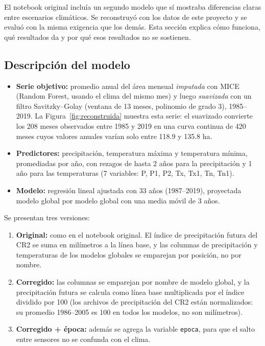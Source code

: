 \documentclass[11pt,a4paper]{article}
\begin{document}
El notebook original incluía un segundo modelo que sí mostraba diferencias claras entre escenarios climáticos. Se reconstruyó con los datos de este proyecto y se evaluó con la misma exigencia que los demás. Esta sección explica cómo funciona, qué resultados da y por qué esos resultados no se sostienen.

\subsection{Descripción del modelo}

\begin{itemize}
\item \textbf{Serie objetivo:} promedio anual del área mensual \emph{imputada} con MICE (Random Forest, usando el clima del mismo mes) y luego \emph{suavizada} con un filtro Savitzky--Golay (ventana de 13 meses, polinomio de grado 3), 1985--2019. La Figura~\ref{fig:reconstruida} muestra esta serie: el suavizado convierte los 208 meses observados entre 1985 y 2019 en una curva continua de 420 meses cuyos valores anuales varían solo entre 118.9 y 135.8 ha.
\item \textbf{Predictores:} precipitación, temperatura máxima y temperatura mínima, promediadas por año, con rezagos de hasta 2 años para la precipitación y 1 año para las temperaturas (7 variables: P, P1, P2, Tx, Tx1, Tn, Tn1).
\item \textbf{Modelo:} regresión lineal ajustada con 33 años (1987--2019), proyectada modelo global por modelo global con una media móvil de 3 años.
\end{itemize}
Se presentan tres versiones:
\begin{enumerate}
\item \textbf{Original:} como en el notebook original. El índice de precipitación futura del CR2 se suma en milímetros a la línea base, y las columnas de precipitación y temperaturas de los modelos globales se emparejan por posición, no por nombre.
\item \textbf{Corregido:} las columnas se emparejan por nombre de modelo global, y la precipitación futura se calcula como línea base multiplicada por el índice dividido por 100 (los archivos de precipitación del CR2 están normalizados: su promedio 1986--2005 es 100 en todos los modelos, no son milímetros).
\item \textbf{Corregido + época:} además se agrega la variable \texttt{epoca}, para que el salto entre sensores no se confunda con el clima.
\end{enumerate}
\end{document}
